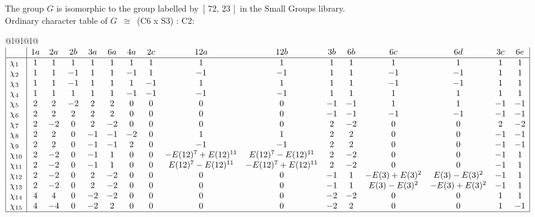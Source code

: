 \documentclass[varwidth=\maxdimen,border=10]{standalone}
\begin{document}
The group $G$ is isomorphic to the group labelled by\ [ 72, 23 ]\ in the Small Groups library.\\
Ordinary character table of $G$\ $\cong$\ (C6 x S3) : C2:\\
\begin{center}
\begin{tabular}{@{}l@{}l@{}l@{}}
\hline
\(\begin{array}{|l|ccccccccccccccc|}
  & 1a & 2a & 2b & 3a & 6a & 4a & 2c & 12a & 12b & 3b & 6b & 6c & 6d & 3c & 6e\\ \hline
\chi_{1} & 1 & 1 & 1 & 1 & 1 & 1 & 1 & 1 & 1 & 1 & 1 & 1 & 1 & 1 & 1\\
\chi_{2} & 1 & 1 & -1 & 1 & 1 & -1 & 1 & -1 & -1 & 1 & 1 & -1 & -1 & 1 & 1\\
\chi_{3} & 1 & 1 & -1 & 1 & 1 & 1 & -1 & 1 & 1 & 1 & 1 & -1 & -1 & 1 & 1\\
\chi_{4} & 1 & 1 & 1 & 1 & 1 & -1 & -1 & -1 & -1 & 1 & 1 & 1 & 1 & 1 & 1\\
\chi_{5} & 2 & 2 & -2 & 2 & 2 & 0 & 0 & 0 & 0 & -1 & -1 & 1 & 1 & -1 & -1\\
\chi_{6} & 2 & 2 & 2 & 2 & 2 & 0 & 0 & 0 & 0 & -1 & -1 & -1 & -1 & -1 & -1\\
\chi_{7} & 2 & -2 & 0 & 2 & -2 & 0 & 0 & 0 & 0 & 2 & -2 & 0 & 0 & 2 & -2\\
\chi_{8} & 2 & 2 & 0 & -1 & -1 & -2 & 0 & 1 & 1 & 2 & 2 & 0 & 0 & -1 & -1\\
\chi_{9} & 2 & 2 & 0 & -1 & -1 & 2 & 0 & -1 & -1 & 2 & 2 & 0 & 0 & -1 & -1\\
\chi_{10} & 2 & -2 & 0 & -1 & 1 & 0 & 0 & -E(12)^{7}+E(12)^{11} & E(12)^{7}-E(12)^{11} & 2 & -2 & 0 & 0 & -1 & 1\\
\chi_{11} & 2 & -2 & 0 & -1 & 1 & 0 & 0 & E(12)^{7}-E(12)^{11} & -E(12)^{7}+E(12)^{11} & 2 & -2 & 0 & 0 & -1 & 1\\
\chi_{12} & 2 & -2 & 0 & 2 & -2 & 0 & 0 & 0 & 0 & -1 & 1 & -E(3)+E(3)^{2} & E(3)-E(3)^{2} & -1 & 1\\
\chi_{13} & 2 & -2 & 0 & 2 & -2 & 0 & 0 & 0 & 0 & -1 & 1 & E(3)-E(3)^{2} & -E(3)+E(3)^{2} & -1 & 1\\
\chi_{14} & 4 & 4 & 0 & -2 & -2 & 0 & 0 & 0 & 0 & -2 & -2 & 0 & 0 & 1 & 1\\
\chi_{15} & 4 & -4 & 0 & -2 & 2 & 0 & 0 & 0 & 0 & -2 & 2 & 0 & 0 & 1 & -1\\
\hline
\end{array}\)\\
\end{tabular}
\end{center}
\end{document}
